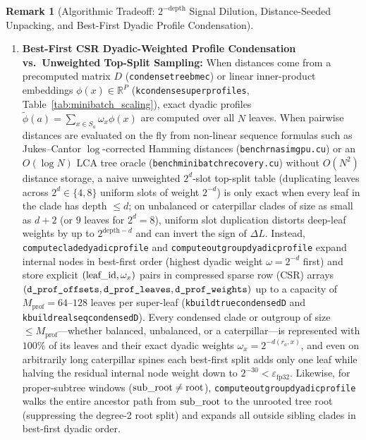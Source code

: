 \documentclass[11pt,a4paper]{article}
\makeatletter
\DeclareRobustCommand{\_}{\ifmmode\nfss@text{\textunderscore}\else\textunderscore\allowbreak\fi}
\theoremstyle{definition}
\newtheorem{remark}[theorem]{Remark}
\makeatother
\begin{document}
\begin{remark}[Algorithmic Tradeoff: $2^{-\text{depth}}$ Signal Dilution, Distance-Seeded Unpacking, and Best-First Dyadic Profile Condensation]
\begin{enumerate}
    \item \textbf{Best-First CSR Dyadic-Weighted Profile Condensation vs.\ Unweighted Top-Split Sampling:} When distances come from a precomputed matrix $D$ (\texttt{condense\_tree\_bme\_c}) or linear inner-product embeddings $\phi(x) \in \mathbb{R}^P$ (\texttt{k\_condense\_super\_profiles}, Table~\ref{tab:minibatch_scaling}), exact dyadic profiles $\widetilde{\phi}(a) = \sum_{x \in S_a} \omega_x \phi(x)$ are computed over all $N$ leaves. When pairwise distances are evaluated on the fly from non-linear sequence formulas such as Jukes--Cantor $\log$-corrected Hamming distances (\texttt{bench\_rnasim\_gpu.cu}) or an $O(\log N)$ LCA tree oracle (\texttt{bench\_minibatch\_recovery.cu}) without $O(N^2)$ distance storage, a naive unweighted $2^d$-slot top-split table (duplicating leaves across $2^d \in \{4, 8\}$ uniform slots of weight $2^{-d}$) is only exact when every leaf in the clade has depth $\le d$; on unbalanced or caterpillar clades of size as small as $d + 2$ (or $9$ leaves for $2^d = 8$), uniform slot duplication distorts deep-leaf weights by up to $2^{\text{depth}-d}$ and can invert the sign of $\Delta L$. Instead, \texttt{compute\_clade\_dyadic\_profile} and \texttt{compute\_outgroup\_dyadic\_profile} expand internal nodes in best-first order (highest dyadic weight $\omega = 2^{-d}$ first) and store explicit $(\text{leaf\_id}, \omega_x)$ pairs in compressed sparse row (CSR) arrays $(\texttt{d\_prof\_offsets}, \texttt{d\_prof\_leaves}, \texttt{d\_prof\_weights})$ up to a capacity of $M_{\text{prof}} = 64\text{--}128$ leaves per super-leaf (\texttt{k\_build\_true\_condensed\_D} and \texttt{k\_build\_real\_seq\_condensed\_D}). Every condensed clade or outgroup of size $\le M_{\text{prof}}$---whether balanced, unbalanced, or a caterpillar---is represented with $100\%$ of its leaves and their exact dyadic weights $\omega_x = 2^{-d(r_a, x)}$, and even on arbitrarily long caterpillar spines each best-first split adds only one leaf while halving the residual internal node weight down to $2^{-30} < \varepsilon_{\text{fp32}}$. Likewise, for proper-subtree windows ($\text{sub\_root} \neq \text{root}$), \texttt{compute\_outgroup\_dyadic\_profile} walks the entire ancestor path from $\text{sub\_root}$ to the unrooted tree root (suppressing the degree-2 root split) and expands all outside sibling clades in best-first dyadic order.
\end{enumerate}
\end{remark}

\end{document}
